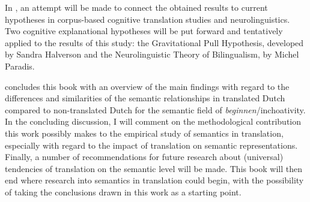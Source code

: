 In , an attempt will be made to connect the obtained results to current hypotheses in corpus-based cognitive translation studies and neurolinguistics. Two cognitive explanational hypotheses will be put forward and tentatively applied to the results of this study: the Gravitational Pull Hypothesis, developed by Sandra Halverson and the Neurolinguistic Theory of Bilingualism, by Michel Paradis.

 concludes this book with an overview of the main findings with regard to the differences and similarities of the semantic relationships in translated Dutch compared to non-translated Dutch for the semantic field of \textit{beginnen}/inchoativity. In the concluding discussion, I will comment on the methodological contribution this work possibly makes to the empirical study of semantics in translation, especially with regard to the impact of translation on semantic representations. Finally, a number of recommendations for future research about (universal) tendencies of translation on the semantic level will be made. This book will then end where research into semantics in translation could begin, with the possibility of taking the conclusions drawn in this work as a starting point.

